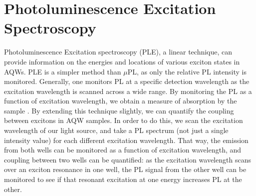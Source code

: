 \section{Photoluminescence Excitation Spectroscopy}
\indent  Photoluminescence Excitation spectroscopy (PLE), a linear technique, can provide information on the energies and locations of various exciton states in AQWs. PLE is a simpler method than $\mu$PL, as only the relative PL intensity is monitored. Generally, one monitors PL at a specific detection wavelength as the excitation wavelength is scanned across a wide range. By monitoring the PL as a function of excitation wavelength, we obtain a measure of absorption by the sample \cite{fox}. By extending this technique slightly, we can quantify the coupling between excitons in AQW samples. In order to do this, we scan the excitation wavelength of our light source, and take a PL spectrum (not just a single intensity value) for each different excitation wavelength. That way, the emission from both wells can be monitored as a function of excitation wavelength, and coupling between two wells can be quantified: as the excitation wavelength scans over an exciton resonance in one well, the PL signal from the other well can be monitored to see if that resonant excitation at one energy increases PL at the other.
